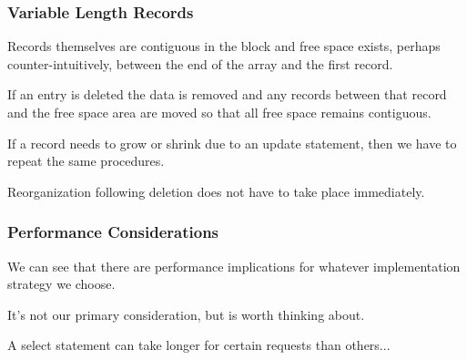 \begin{frame}
\frametitle{Variable Length Records}

Records themselves are contiguous in the block and free space exists, perhaps counter-intuitively, between the end of the array and the first record.

If an entry is deleted the data is removed and any records between that record and the free space area are moved so that all free space remains contiguous.

If a record needs to grow or shrink due to an update statement, then we have to repeat the same procedures.

Reorganization following deletion does not have to take place immediately.

\end{frame}



\begin{frame}
\frametitle{Performance Considerations}

We can see that there are performance implications for whatever implementation strategy we choose. 

It's not our primary consideration, but is worth thinking about.

A select statement can take longer for certain requests than others...


\end{frame}






